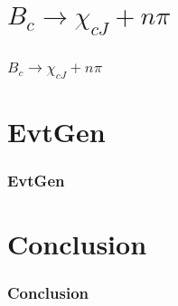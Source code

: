 \documentclass{beamer}
\begin{document}
\begin{frame}[t]
\begin{columns}
\begin{column}{0.5\textwidth}
    \end{column}
  \end{columns}
\end{frame}

  
\section{$B_c\to \chi_{cJ}+n\pi$}
\begin{frame}
  \frametitle{$B_c\to \chi_{cJ}+n\pi$}
\end{frame}

\section{EvtGen}
\begin{frame}
  \frametitle{EvtGen}
\end{frame}


\section{Conclusion}
\begin{frame}
  \frametitle{Conclusion}
\end{frame}
\end{document}
